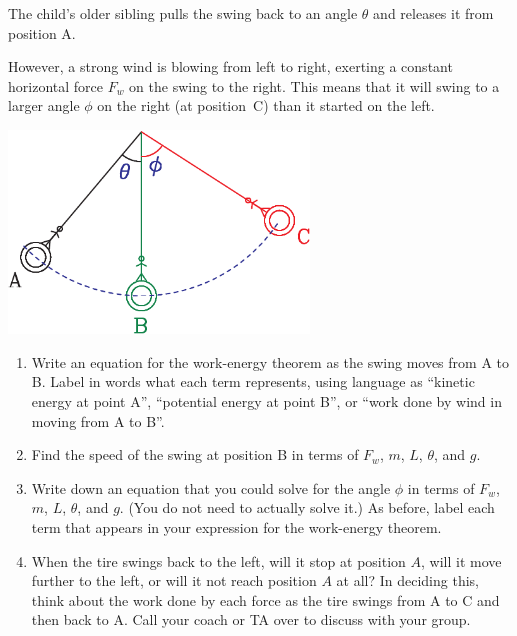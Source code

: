 \documentclass[12pt]{article}
\begin{document}
 	The child's older sibling pulls the swing back to an angle $\theta$ and releases it from position A.
 	
 	However, a strong wind is blowing from left to right, exerting a constant horizontal force $F_w$ on the swing to the right. This means that it will swing to a larger angle $\phi$ on the right (at position~C) than it started on the left.




 	\begin{center}
 		\includegraphics[width=0.6\textwidth]{swing-crop.pdf}
 	\end{center}

 
   \begin{enumerate}
 	\item Write an equation for the work-energy theorem as the swing moves from A to B. Label in words what each term represents, using language as ``kinetic energy at point A'', ``potential energy at point B'', or ``work done by wind in moving from A to B''.
 	
 	\vspace{3in}
 	
 	\newpage
 	\item Find the speed of the swing at position B in terms of $F_w$, $m$, $L$, $\theta$, and $g$.
 	
 	\vspace{2in}
 
 	\item Write down an equation that you could solve for the angle $\phi$ in terms of $F_w$, $m$, $L$, $\theta$, and $g$. (You do not need to actually solve it.) As before, label each term that appears in your expression for the work-energy theorem.
 	
 	
 	\vspace{4in}
 	
 	\item When the tire swings back to the left, will it stop at position $A$, will it move further to the left, or will it not reach position $A$ at all? In deciding this, think about the work done by each force as the tire swings from A to C and then back to A. Call your coach or TA over to discuss with your group.
 \end{enumerate}
 
\end{document}

